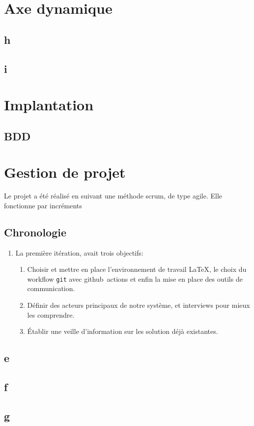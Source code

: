 \documentclass[a4paper,french,final]{memoir}
\begin{document}
\chapter{Axe dynamique}\label{chapDynamique}
\section{h}
\section{i}
\chapter{Implantation}\label{chapImplantation}
\section{BDD}
\chapter{Gestion de projet}\label{chapGestProjet}
Le projet a été réalisé en suivant une méthode scrum, de type agile. Elle fonctionne par incréments 
\section{Chronologie}
\begin{enumerate}[label=\textbf{Itération~n\kern-0.5bp\textsuperscript{o}~\arabic*:},start=0]
    \item La première itération, avait trois objectifs:
    \begin{enumerate}
        \item [\ding{51}]Choisir et mettre en place l'environnement de travail \LaTeX, le choix du workflow \texttt{git} avec github~actions et enfin la mise en place des outils de communication.
        \item [\ding{51}]Définir des acteurs principaux de notre système, et interviews pour mieux les comprendre.
        \item [\ding{51}]Établir une veille d'information sur les solution déjà existantes.
    \end{enumerate}
\end{enumerate}
\section{e}
\section{f}
\section{g}
\appendixpage
\appendix

\backmatter
\listoffigures
\end{document}
